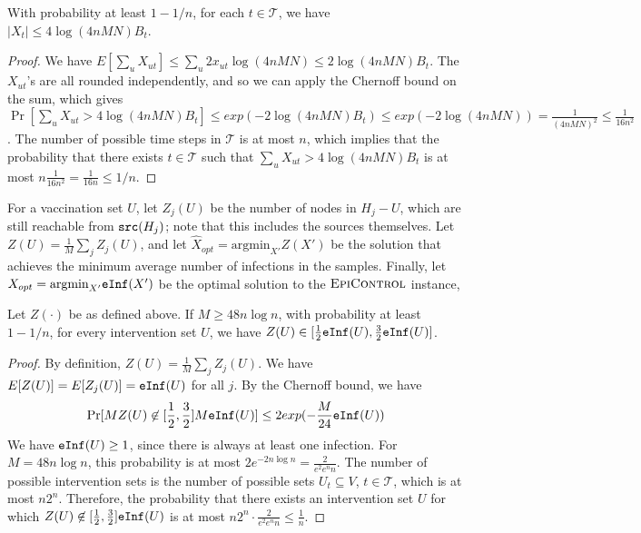 \noindent
\begin{lemma}
\label{lem:budget}
With probability at least $1-1/n$, for each $t\in \mathcal{T}$, we have
$|X_t|\leq 4\log(4nMN)B_t$.
\end{lemma}
\begin{proof}
We have $E[\sum_u X_{ut}]\leq \sum_u 2x_{ut}\log(4nMN) \leq 2\log(4nMN)B_t$.
The $X_{ut}$'s are all rounded independently, and so we can apply the Chernoff bound on the sum, which gives
$\Pr[\sum_u X_{ut} > 4\log(4nMN)B_t] \leq exp(-2\log(4nMN)B_t) \leq exp(-2\log(4nMN))= \frac{1}{(4nMN)^2}\leq \frac{1}{16n^2}$.
The number of possible time steps in $\mathcal{T}$ is at most $n$, which implies that the probability that there exists 
$t\in\mathcal{T}$ such that $\sum_u X_{ut} > 4\log(4nMN)B_t$ is at most $n\frac{1}{16n^2}=\frac{1}{16n}\leq 1/n$.
\end{proof}

For a vaccination set $U$, let $Z_j(U)$ be the number of nodes in 
$H_j-U$, which are still reachable from $\texttt{src}(H_j)$;
note that this includes the sources themselves.
Let $Z(U)=\frac{1}{M}\sum_j Z_j(U)$, and let $\hat{X}_{opt}=\mbox{argmin}_{X'}Z(X')$ be the solution that
achieves the minimum average number of infections in the samples.
Finally, let $X_{opt}=\mbox{argmin}_{X'}\texttt{eInf}(X')$ be the optimal solution to the $\textsc{EpiControl}{}$ instance,

\begin{lemma}
\label{lemma:conc}
Let $Z(\cdot)$ be as defined above. If $M\geq 48n\log{n}$, with probability at least $1-1/n$, for every intervention set $U$,
we have $Z(U)\in [\frac{1}{2}\texttt{eInf}(U), \frac{3}{2}\texttt{eInf}(U)]$.
\end{lemma}
\begin{proof}
By definition, $Z(U)=\frac{1}{M}\sum_j Z_j(U)$.
We have $E[Z(U)] = E[Z_j(U)]=\texttt{eInf}(U)$ for all $j$.
By the Chernoff bound, we have
\[
\Pr[MZ(U)\not\in [\frac{1}{2}, \frac{3}{2}]M\texttt{eInf}(U)]\leq 2exp(-\frac{M}{24}\texttt{eInf}(U))
\]
We have $\texttt{eInf}(U)\geq 1$, since there is always at least one infection.
For $M=48n\log{n}$, this probability is at most $2e^{-2n\log{n}} = \frac{2}{e^2e^nn}$.
The number of possible intervention sets is the number of possible sets $U_t\subseteq V$, $t\in\mathcal{T}$,
which is at most $n2^n$.
Therefore, the probability that there exists an intervention set $U$ for which
$Z(U)\not\in [\frac{1}{2}, \frac{3}{2}]\texttt{eInf}(U)$ is at most $n2^n\cdot \frac{2}{e^2e^nn}\leq \frac{1}{n}$.
\end{proof}

